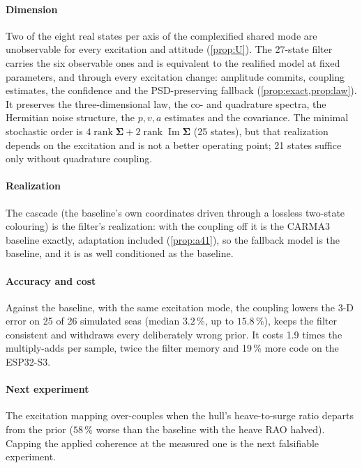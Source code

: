 \documentclass[conference]{IEEEtran}
\DeclareRobustCommand{\mat}[1]{\bm{#1}}
\renewcommand{\Im}{\operatorname{Im}}
\theoremstyle{bodysmall}
\begin{document}
\paragraph{Dimension}
Two of the eight real states per axis of the complexified shared mode are
unobservable for every excitation and attitude (\cref{prop:U}). The 27-state
filter carries the six observable ones and is equivalent to the realified
model at fixed parameters, and through every excitation change: amplitude
commits, coupling estimates, the confidence and the PSD-preserving fallback
(\cref{prop:exact,prop:law}). It preserves the three-dimensional law, the co-
and quadrature spectra, the Hermitian noise structure, the $p,v,a$ estimates
and the covariance. The minimal stochastic order is
$4\operatorname{rank}\mat\Sigma+2\operatorname{rank}\Im\mat\Sigma$ (25 states),
but that realization depends on the excitation and is not a better operating
point; 21 states suffice only without quadrature coupling.

\paragraph{Realization}
The cascade (the baseline's own coordinates driven through a lossless
two-state colouring) is the filter's realization: with the coupling off it is
the CARMA3 baseline exactly, adaptation included (\cref{prop:a41}), so the
fallback model is the baseline, and it is as well conditioned as the
baseline.

\paragraph{Accuracy and cost}
Against the baseline, with the same excitation mode, the coupling lowers the
3-D error on 25 of 26 simulated seas (median $3.2\,\%$, up to $15.8\,\%$),
keeps the filter consistent and withdraws every deliberately wrong prior. It
costs 1.9 times the multiply-adds per sample, twice the filter memory and
19\,\% more code on the ESP32-S3.

\paragraph{Next experiment}
The excitation mapping over-couples when the hull's heave-to-surge ratio
departs from the prior ($58\,\%$ worse than the baseline with the heave RAO
halved). Capping the applied coherence at the measured one is the next
falsifiable experiment.
\end{document}
